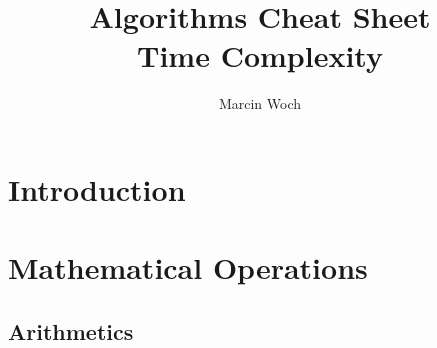 \documentclass{article}
\author{Marcin Woch}
\title{Algorithms Cheat Sheet \\
\large Time Complexity\\}
\date{}
\begin{document}
\maketitle

\newpage
\tableofcontents

\newpage
\section*{Introduction}


\newpage
\section*{Mathematical Operations}
\subsection*{Arithmetics}
\end{document}
